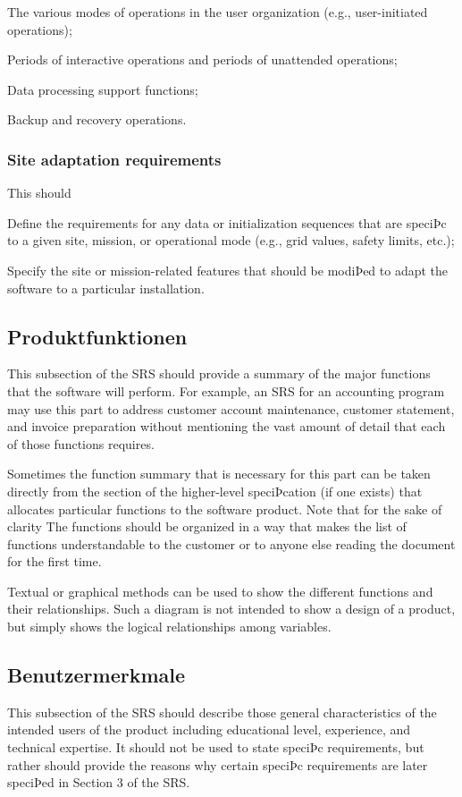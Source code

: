 			The various modes of operations in the user organization (e.g., user-initiated operations);
			
			Periods of interactive operations and periods of unattended operations;
			
			Data processing support functions;
			
			Backup and recovery operations.
		
		\subsubsection{Site adaptation requirements}
			This should
			
			Define the requirements for any data or initialization sequences that are speciÞc to a given site, mission, or operational mode (e.g., grid values, safety limits, etc.);
			
			Specify the site or mission-related features that should be modiÞed to adapt the software to a particular installation.
		
	\subsection{Produktfunktionen}
		This subsection of the SRS should provide a summary of the major functions that the software will perform. For example, an SRS for an accounting program may use this part to address customer account maintenance, customer statement, and invoice preparation without mentioning the vast amount of detail that each of those functions requires.
		
		Sometimes the function summary that is necessary for this part can be taken directly from the section of the higher-level speciÞcation (if one exists) that allocates particular functions to the software product. Note that for the sake of clarity The functions should be organized in a way that makes the list of functions understandable to the customer or to anyone else reading the document for the first time.
		
		Textual or graphical methods can be used to show the different functions and their relationships. Such a diagram is not intended to show a design of a product, but simply shows the logical relationships among variables.
	
	\subsection{Benutzermerkmale}
		This subsection of the SRS should describe those general characteristics of the intended users of the product including educational level, experience, and technical expertise. It should not be used to state speciÞc requirements, but rather should provide the reasons why certain speciÞc requirements are later speciÞed in Section 3 of the SRS.
		

